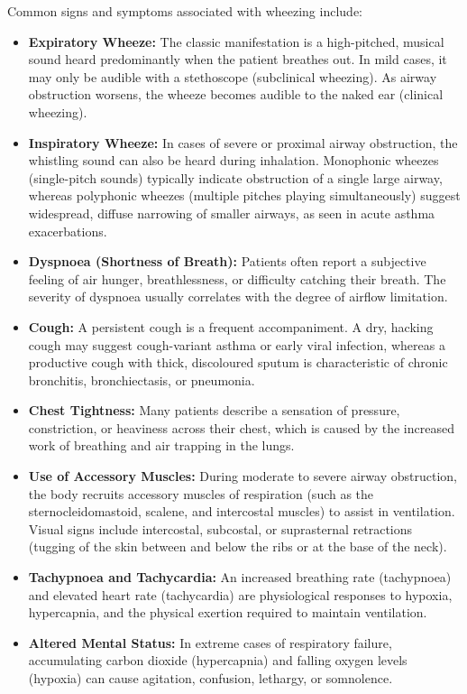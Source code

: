 Common signs and symptoms associated with wheezing include:
\begin{itemize}
    \item \textbf{Expiratory Wheeze:} The classic manifestation is a high-pitched, musical sound heard predominantly when the patient breathes out. In mild cases, it may only be audible with a stethoscope (subclinical wheezing). As airway obstruction worsens, the wheeze becomes audible to the naked ear (clinical wheezing).
    \item \textbf{Inspiratory Wheeze:} In cases of severe or proximal airway obstruction, the whistling sound can also be heard during inhalation. Monophonic wheezes (single-pitch sounds) typically indicate obstruction of a single large airway, whereas polyphonic wheezes (multiple pitches playing simultaneously) suggest widespread, diffuse narrowing of smaller airways, as seen in acute asthma exacerbations.
    \item \textbf{Dyspnoea (Shortness of Breath):} Patients often report a subjective feeling of air hunger, breathlessness, or difficulty catching their breath. The severity of dyspnoea usually correlates with the degree of airflow limitation.
    \item \textbf{Cough:} A persistent cough is a frequent accompaniment. A dry, hacking cough may suggest cough-variant asthma or early viral infection, whereas a productive cough with thick, discoloured sputum is characteristic of chronic bronchitis, bronchiectasis, or pneumonia.
    \item \textbf{Chest Tightness:} Many patients describe a sensation of pressure, constriction, or heaviness across their chest, which is caused by the increased work of breathing and air trapping in the lungs.
    \item \textbf{Use of Accessory Muscles:} During moderate to severe airway obstruction, the body recruits accessory muscles of respiration (such as the sternocleidomastoid, scalene, and intercostal muscles) to assist in ventilation. Visual signs include intercostal, subcostal, or suprasternal retractions (tugging of the skin between and below the ribs or at the base of the neck).
    \item \textbf{Tachypnoea and Tachycardia:} An increased breathing rate (tachypnoea) and elevated heart rate (tachycardia) are physiological responses to hypoxia, hypercapnia, and the physical exertion required to maintain ventilation.
    \item \textbf{Altered Mental Status:} In extreme cases of respiratory failure, accumulating carbon dioxide (hypercapnia) and falling oxygen levels (hypoxia) can cause agitation, confusion, lethargy, or somnolence.
\end{itemize}

